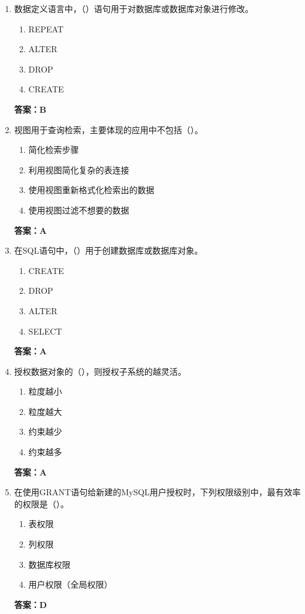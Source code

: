 \documentclass[12pt, a4paper]{article}
\begin{document}
\begin{enumerate}[label=\arabic*.]
	\item 数据定义语言中，（\quad）语句用于对数据库或数据库对象进行修改。
	      \begin{enumerate}
		      \item REPEAT
		      \item ALTER
		      \item DROP
		      \item CREATE
	      \end{enumerate}
	      \textbf{答案：B}

	\item 视图用于查询检索，主要体现的应用中不包括（\quad）。
	      \begin{enumerate}
		      \item 简化检索步骤
		      \item 利用视图简化复杂的表连接
		      \item 使用视图重新格式化检索出的数据
		      \item 使用视图过滤不想要的数据
	      \end{enumerate}
	      \textbf{答案：A}

	\item 在SQL语句中，（\quad）用于创建数据库或数据库对象。
	      \begin{enumerate}
		      \item CREATE
		      \item DROP
		      \item ALTER
		      \item SELECT
	      \end{enumerate}
	      \textbf{答案：A}

	\item 授权数据对象的（\quad），则授权子系统的越灵活。
	      \begin{enumerate}
		      \item 粒度越小
		      \item 粒度越大
		      \item 约束越少
		      \item 约束越多
	      \end{enumerate}
	      \textbf{答案：A}

	\item 在使用GRANT语句给新建的MySQL用户授权时，下列权限级别中，最有效率的权限是（\quad）。
	      \begin{enumerate}
		      \item 表权限
		      \item 列权限
		      \item 数据库权限
		      \item 用户权限（全局权限）
	      \end{enumerate}
	      \textbf{答案：D}


\end{enumerate}
\end{document}
